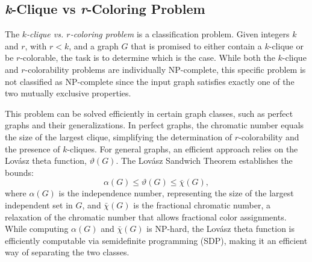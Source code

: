 \subsection{\textit{k}-Clique vs \textit{r}-Coloring Problem}




The \textit{$k$-clique vs. $r$-coloring problem} is a classification problem. Given integers $k$ and $r$, with $r < k$, and a graph $G$ that is promised to either contain a $k$-clique or be $r$-colorable, the task is to determine which is the case. While both the $k$-clique and $r$-colorability problems are individually NP-complete, this specific problem is not classified as NP-complete since the input graph satisfies exactly one of the two mutually exclusive properties.

This problem can be solved efficiently in certain graph classes, such as perfect graphs and their generalizations. In perfect graphs, the chromatic number equals the size of the largest clique, simplifying the determination of $r$-colorability and the presence of $k$-cliques.  For general graphs, an efficient approach relies on the Lovász theta function, $\vartheta(G)$. The Lovász Sandwich Theorem establishes the bounds:
\begin{equation}
    \alpha(G) \leq \vartheta(G) \leq \bar{\chi}(G),
\end{equation}
\citep{lovasztheta}
where $\alpha(G)$ is the independence number, representing the size of the largest independent set in $G$, and $\bar{\chi}(G)$ is the fractional chromatic number, a relaxation of the chromatic number that allows fractional color assignments. While computing $\alpha(G)$ and $\bar{\chi}(G)$ is NP-hard, the Lovász theta function is efficiently computable via semidefinite programming (SDP), making it an efficient way of separating the two classes. 







